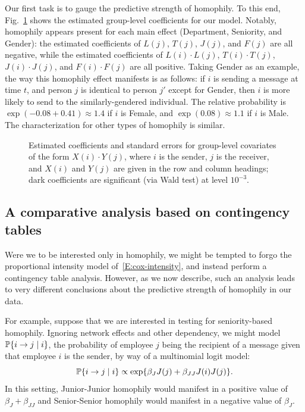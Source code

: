 \documentclass[final]{statsoc}
\begin{document}
Our first task is to gauge the predictive strength of homophily.  To this end, 
Fig.~\ref{T:group-dynamic} shows the estimated group-level coefficients for
our model.  Notably, homophily appears present for each
main effect (Department, Seniority, and Gender): the estimated coefficients of
$L(j)$, $T(j)$, $J(j)$, and $F(j)$ are all negative, while the estimated
coefficients of $L(i) \cdot L(j)$, $T(i) \cdot T(j)$, $J(i) \cdot J(j)$, and
$F(i) \cdot F(j)$ are all positive.  Taking Gender as an example, the way this homophily 
effect manifests is as follows: if $i$ is sending a message at time $t$, and person $j$ is
identical to person $j'$ except for Gender, then $i$ is more likely to send to
the similarly-gendered individual.  The relative probability is $\exp(-0.08 +
0.41) \approx 1.4$ if $i$ is Female, and $\exp(0.08) \approx 1.1$ if $i$ is
Male.  The characterization for other types of homophily is similar.

\begin{figure}
  \centering
  \makebox[\textwidth]{
    \scriptsize
    
  }
  \caption{
    Estimated coefficients and standard errors for group-level covariates
    of the form $X(i) \cdot Y(j)$, where $i$ is the sender, $j$ is the
    receiver, and $X(i)$ and $Y(j)$ are given in the row and column
    headings; dark coefficients are significant (via Wald test) at
    level $10^{-3}$.
  }
  \label{T:group-dynamic}
\end{figure}


\subsection{A comparative analysis based on contingency tables}

Were we to be interested only in homophily, we might be tempted to forgo
the proportional intensity model of~\eqref{E:cox-intensity}, and instead 
perform a contingency table analysis.  However, as we now describe, 
such an analysis leads to very different conclusions
about the predictive strength of homophily in our data.

For example, suppose that we are interested in testing for seniority-based homophily.  Ignoring
network effects and other dependency, we might model $\mathbb{P}\{ i \to j \mid i
\}$, the probability of employee $j$ being the recipient of a message given
that employee $i$ is the sender, by way of a multinomial logit model:
\[
  \mathbb{P}\{ i \to j \mid i \}
    \propto \exp\{ \beta_J J(j) + \beta_{JJ} J(i) J(j) \}.
\]
In this setting, 
Junior-Junior homophily would manifest in a positive value of
$\beta_{J} + \beta_{JJ}$ and Senior-Senior homophily would manifest in
a negative value of $\beta_J$.
\end{document}
